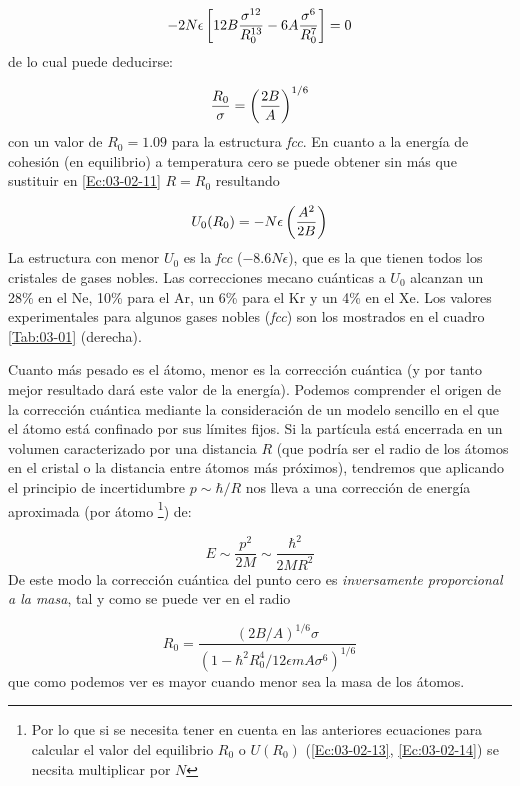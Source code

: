 \begin{equation}
	-2N\epsilon \left[  12 B \frac{\sigma^{12}}{R_0^{13}} - 6 A \frac{\sigma^6}{R_0^7} \right] = 0 \label{Ec:03-02-12}
\end{equation}	
de lo cual puede deducirse:

\begin{equation}
	\frac{R_0}{\sigma} =  \left( \frac{2B}{A} \right)^{1/6} \label{Ec:03-02-13}
\end{equation}
con un valor de $R_0=1.09$ para la estructura \textit{fcc}. En cuanto a la energía de cohesión (en equilibrio) a temperatura cero se puede obtener sin más que sustituir en \ref{Ec:03-02-11} $R=R_0$ resultando

\begin{equation}
	U_0 (R_0) = - N\epsilon \left( \frac{A^2}{2B} \right) \label{Ec:03-02-14}
\end{equation}
La estructura con menor $U_0$ es la \textit{fcc} ($-8.6 N\epsilon$), que es la que tienen todos los cristales de gases nobles. Las correcciones mecano cuánticas a $U_0$ alcanzan un 28\% en el Ne, 10\% para el Ar, un 6\% para el Kr y un  4\% en el Xe. Los valores experimentales para algunos gases nobles (\textit{fcc}) son los mostrados en el cuadro \ref{Tab:03-01} (derecha).

Cuanto más pesado es el átomo, menor es la corrección cuántica (y por tanto mejor resultado dará este valor de la energía). Podemos comprender el origen de la corrección cuántica mediante la consideración de un modelo sencillo en el que el átomo está confinado por sus límites fijos. Si la partícula está encerrada en un volumen caracterizado por una distancia $R$ (que podría ser el radio de los átomos en el cristal o la distancia entre átomos más próximos), tendremos que aplicando el principio de incertidumbre $p\sim \hbar /R$ nos lleva a una corrección de energía aproximada (por átomo \footnote{Por lo que si se necesita tener en cuenta en las anteriores ecuaciones para calcular el valor del equilibrio  $R_0$ o $U(R_0)$ (\ref{Ec:03-02-13}, \ref{Ec:03-02-14}) se necsita multiplicar por $N$}) de:

\begin{equation*}
	E \sim \frac{p^2}{2M} \sim \frac{\hbar^2}{2M R^2} 
\end{equation*} 
De este modo la corrección cuántica del punto cero es \textit{inversamente proporcional a la masa}, tal y como se puede ver en el radio

\begin{equation}
	R_0 = \frac{(2B/A)^{1/6} \sigma}{(1-\hbar^2 R_0^4 / 12\epsilon m A \sigma^6)^{1/6}}
\end{equation}
que como podemos ver es mayor cuando menor sea la masa de los átomos. 

